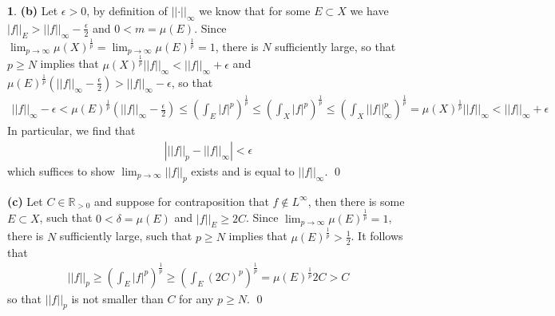 \documentclass[10.5pt]{article}
\theoremstyle{definition}
\newtheorem{pb}{}
\newcommand{\abs}[1]{\left\vert#1\right\vert}
\newcommand{\norm}[1]{\lvert\lvert#1\rvert\rvert}
\begin{document}
\begin{pb}
        \textbf{(b)}
        Let \(\epsilon > 0\), by definition of \(\norm{\cdot}_\infty\) we know that for some \(E \subset X\) we have \(\abs{f}\vert_E > \norm{f}_\infty - \frac{\epsilon}{2}\) and \(0 < m = \mu(E)\). Since \(\lim_{p\to\infty}\mu(X)^{\frac{1}{p}} = \lim_{p\to\infty}\mu(E)^{\frac{1}{p}} = 1\), there is \(N\) sufficiently large, so that \(p \geq N\) implies that \(\mu(X)^{\frac{1}{p}}\norm{f}_\infty < \norm{f}_\infty + \epsilon\) and \(\mu(E)^{\frac{1}{p}}(\norm{f}_\infty - \frac{\epsilon}{2}) > \norm{f}_\infty - \epsilon\), so that
        \begin{align*}
            \norm{f}_\infty - \epsilon < \mu(E)^{\frac{1}{p}}\left(\norm{f}_\infty - \frac{\epsilon}{2}\right) \leq \left(\int_E\abs{f}^p\right)^{\frac{1}{p}} \leq \left(\int_X \abs{f}^p\right)^{\frac{1}{p}} \leq \left(\int_X \norm{f}_\infty^p\right)^{\frac{1}{p}} = \mu(X)^{\frac{1}{p}}\norm{f}_\infty < \norm{f}_\infty + \epsilon
        \end{align*}
        In particular, we find that
        \begin{align*}
            \abs{\norm{f}_p - \norm{f}_\infty} < \epsilon
        \end{align*}
        which suffices to show \(\lim_{p\to\infty} \norm{f}_p\) exists and is equal to \(\norm{f}_\infty\). \qed

        \textbf{(c)} Let \(C \in \mathbb{R}_{>0}\) and suppose for contraposition that \(f \not \in L^\infty\), then there is some \(E \subset X\), such that \(0 < \delta = \mu(E)\) and \(\abs{f}\vert_E \geq 2C\). Since \(\lim_{p\to\infty}\mu(E)^{\frac{1}{p}} = 1\), there is \(N\) sufficiently large, such that \(p \geq N\) implies that \(\mu(E)^{\frac{1}{p}} > \frac12\). It follows that
        \begin{align*}
            \norm{f}_p \geq \left(\int_E \abs{f}^p\right)^{\frac{1}{p}} \geq \left(\int_E (2C)^p\right)^{\frac{1}{p}} = \mu(E)^{\frac{1}{p}}2C > C
        \end{align*}
        so that \(\norm{f}_p\) is not smaller than \(C\) for any \(p \geq N\). \qed


\end{pb}
\end{document}
